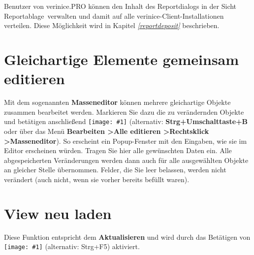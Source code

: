 \documentclass[a4paper,10pt]{book}
\newcommand{\icon}[1]{\texttt{[image: \#1]}}
\begin{document}
Benutzer von verinice.PRO können den Inhalt des Reportdialogs in der
Sicht \glqq Reportablage\grqq\ verwalten und damit auf alle
verinice-Client-Installationen verteilen. Diese Möglichkeit wird in
Kapitel {\em \ref{reportdeposit} } beschrieben.


\section{Gleichartige Elemente gemeinsam editieren}
Mit dem sogenannten \textbf{Masseneditor} können mehrere gleichartige Objekte zusammen bearbeitet werden. Markieren Sie dazu die zu
verändernden Objekte und betätigen anschließend \icon{Icon/Masseneditor.png} (alternativ: \textbf{Strg+Umschalttaste+B} oder über das
Menü \textbf{Bearbeiten \textgreater Alle editieren \textgreater Rechtsklick \textgreater Masseneditor}). So erscheint ein Popup-Fenster mit den Eingaben,
wie sie im Editor erscheinen würden. Tragen Sie hier alle gewünschten Daten ein. Alle abgespeicherten Veränderungen
werden dann auch für alle ausgewählten Objekte an gleicher Stelle übernommen. Felder, die Sie leer belassen, werden
nicht verändert (auch nicht, wenn sie vorher bereits befüllt waren).

\section{View neu laden}
Diese Funktion entspricht dem \textbf{Aktualisieren} und wird durch das Betätigen von \icon{Icon/Aktualisieren.png} (alternativ: Strg+F5) aktiviert.
\end{document}
